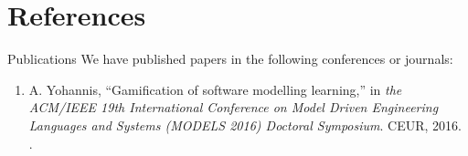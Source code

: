 \documentclass[12pt, a4paper]{report}
\begin{document}
\chapter{References}
\label{References}

\begingroup

\renewcommand{\chapter}[2]{}%

\endgroup

\chapter{Publications}
\label{Publications}
We have published papers in the following conferences or journals: 
\begin{enumerate}
 \item A. Yohannis, ``Gamification of software modelling learning,'' in
 \textit{the ACM/IEEE 19th International Conference on Model Driven Engineering Languages and Systems (MODELS 2016) Doctoral Symposium}. CEUR, 2016. \cite{Yohannis2016}.
\end{enumerate}
\end{document}
